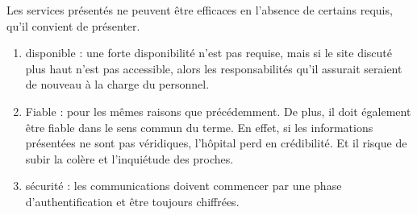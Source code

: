 Les services présentés ne peuvent être efficaces en l'absence de certains requis, qu'il convient de présenter.
\begin{enumerate}
    \item disponible : une forte disponibilité n'est pas requise, mais si le site discuté plus haut n'est pas accessible, alors les
    responsabilités qu'il assurait seraient de nouveau à la charge du personnel.
    \item Fiable : pour les mêmes raisons que précédemment. De plus, il doit également être fiable dans le sens commun du terme.
    En effet, si les informations présentées ne sont pas véridiques, l'hôpital perd en crédibilité. Et il risque de subir la
    colère et l'inquiétude des proches.
    \item sécurité : les communications doivent commencer par une phase d'authentification et être toujours chiffrées.
 \end{enumerate}
